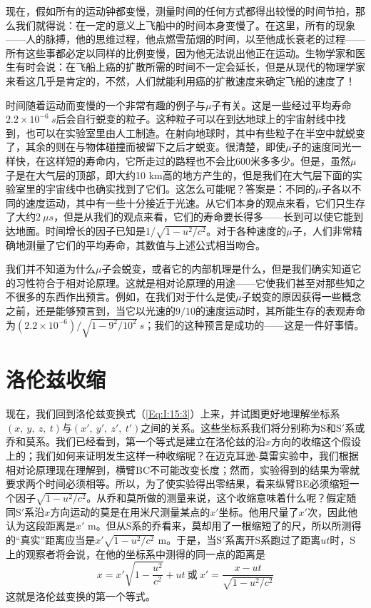 现在，假如所有的运动钟都变慢，测量时间的任何方式都得出较慢的时间节拍，那么我们就得说：在一定的意义上飞船中的时间本身变慢了。在这里，所有的现象——人的脉搏，他的思维过程，他点燃雪茄烟的时间，以至他成长衰老的过程——所有这些事都必定以同样的比例变慢，因为他无法说出他正在运动。生物学家和医生有时会说：在飞船上癌的扩散所需的时间不一定会延长，但是从现代的物理学家来看这几乎是肯定的，不然，人们就能利用癌的扩散速度来确定飞船的速度了！

时间随着运动而变慢的一个非常有趣的例子与$\mu$子有关。这是一些经过平均寿命$2.2 \times 10^{-6}~s$后会自行蜕变的粒子。这种粒子可以在到达地球上的宇宙射线中找到，也可以在实验室里由人工制造。在射向地球时，其中有些粒子在半空中就蜕变了，其余的则在与物体碰撞而被留下之后才蜕变。很清楚，即使$\mu$子的速度同光一样快，在这样短的寿命内，它所走过的路程也不会比600米多多少。但是，虽然$\mu$子是在大气层的顶部，即大约10 km高的地方产生的，但是我们在大气层下面的实验室里的宇宙线中也确实找到了它们。这怎么可能呢？答案是：不同的$\mu$子各以不同的速度运动，其中有一些十分接近于光速。从它们本身的观点来看，它们只生存了大约$2~\mu s$，但是从我们的观点来看，它们的寿命要长得多——长到可以使它能到达地面。时间增长的因子已知是$1/\sqrt{1-u^2/c^2}$。对于各种速度的$\mu$子，人们非常精确地测量了它们的平均寿命，其数值与上述公式相当吻合。

我们并不知道为什么$\mu$子会蜕变，或者它的内部机理是什么，但是我们确实知道它的习性符合于相对论原理。这就是相对论原理的用途——它使我们甚至对那些知之不很多的东西作出预言。例如，在我们对于什么是使$\mu$子蜕变的原因获得一些概念之前，还是能够预言到，当它以光速的$9/10$的速度运动时，其所能生存的表观寿命为$(2.2 \times 10^{-6})/\sqrt{1-9^2/10^2}~s$；我们的这种预言是成功的——这是一件好事情。

\section{洛伦兹收缩}

现在，我们回到洛伦兹变换式（\ref{Eq:I:15:3}）上来，并试图更好地理解坐标系$(x,~y,~z,~t)$与$(x',~y',~z',~t')$之间的关系。这些坐标系我们将分别称为S和S$'$系或乔和莫系。我们已经看到，第一个等式是建立在洛伦兹的沿$x$方向的收缩这个假设上的；我们如何来证明发生这样一种收缩呢？在迈克耳逊-莫雷实验中，我们根据相对论原理现在理解到，横臂BC不可能改变长度；然而，实验得到的结果为零就要求两个时间必须相等。所以，为了使实验得出零结果，看来纵臂BE必须缩短一个因子$\sqrt{1-u^2/c^2}$。从乔和莫所做的测量来说，这个收缩意味着什么呢？假定随同S$'$系沿$x$方向运动的莫是在用米尺测量某点的$x'$坐标。他用尺量了$x'$次，因此他认为这段距离是$x'$ m。但从S系的乔看来，莫却用了一根缩短了的尺，所以所测得的“真实”距离应当是$x'\sqrt{1-u^2/c^2}$ m。于是，当S$'$系离开S系跑过了距离$ut$时，S上的观察者将会说，在他的坐标系中测得的同一点的距离是
\begin{equation*}
    x=x'\sqrt{1-\frac{u^2}{c^2}}+ut~\text{或}~x'=\frac{x-ut}{\sqrt{1-u^2/c^2}}
\end{equation*}
这就是洛伦兹变换的第一个等式。


